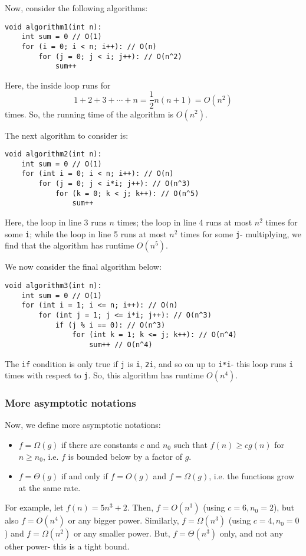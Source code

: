 \documentclass[a4paper, openany]{memoir}
\begin{document}
\noindent Now, consider the following algorithms:
\begin{lstlisting}[language=pseudocode]
void algorithm1(int n):
    int sum = 0 // O(1)
    for (i = 0; i < n; i++): // O(n)
        for (j = 0; j < i; j++): // O(n^2)
            sum++
\end{lstlisting}
Here, the inside loop runs for
\[1 + 2 + 3 + \cdots + n = \frac{1}{2}n(n+1) = O(n^2)\]
times. So, the running time of the algorithm is $O(n^2)$.

\noindent The next algorithm to consider is:
\begin{lstlisting}[language=pseudocode]
void algorithm2(int n):
    int sum = 0 // O(1)
    for (int i = 0; i < n; i++): // O(n)
        for (j = 0; j < i*i; j++): // O(n^3)
            for (k = 0; k < j; k++): // O(n^5)
                sum++
\end{lstlisting}
Here, the loop in line 3 runs $n$ times; the loop in line 4 runs at most $n^2$ times for some \texttt{i}; while the loop in line 5 runs at most $n^2$ times for some \texttt{j}- multiplying, we find that the algorithm has runtime $O(n^5)$.

\noindent We now consider the final algorithm below:
\begin{lstlisting}[language=pseudocode]
void algorithm3(int n):
    int sum = 0 // O(1)
    for (int i = 1; i <= n; i++): // O(n)
        for (int j = 1; j <= i*i; j++): // O(n^3)
            if (j % i == 0): // O(n^3)
                for (int k = 1; k <= j; k++): // O(n^4)
                    sum++ // O(n^4)
\end{lstlisting}
The \texttt{if} condition is only true if \texttt{j} is \texttt{i}, \texttt{2i}, and so on up to \texttt{i*i}- this loop runs \texttt{i} times with respect to \texttt{j}. So, this algorithm has runtime $O(n^4)$.

\subsubsection{More asymptotic notations}
Now, we define more asymptotic notations:
\begin{itemize}
    \item $f = \Omega(g)$ if there are constants $c$ and $n_0$ such that $f(n) \geq cg(n)$ for $n \geq n_0$, i.e. $f$ is bounded below by a factor of $g$.
    \item $f = \Theta(g)$ if and only if $f = O(g)$ and $f = \Omega(g)$, i.e. the functions grow at the same rate.
\end{itemize}
For example, let $f(n) = 5n^3 + 2$. Then, $f = O(n^3)$ (using $c = 6, n_0 = 2$), but also $f = O(n^4)$ or any bigger power. Similarly, $f = \Omega(n^3)$ (using $c = 4, n_0 = 0$) and $f = \Omega(n^2)$ or any smaller power. But, $f = \Theta(n^3)$ only, and not any other power- this is a tight bound.
\newpage
\end{document}

